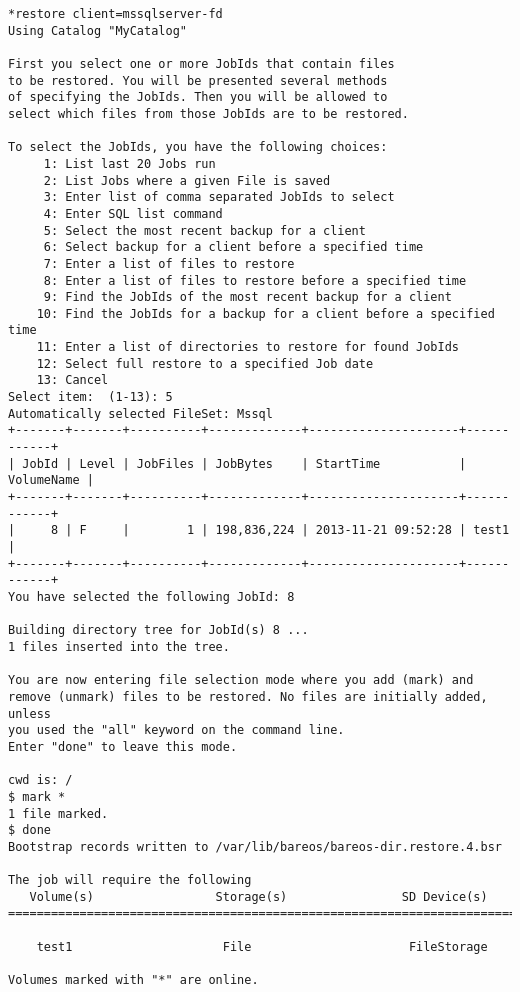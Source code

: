 \footnotesize
\begin{verbatim}
*restore client=mssqlserver-fd
Using Catalog "MyCatalog"

First you select one or more JobIds that contain files
to be restored. You will be presented several methods
of specifying the JobIds. Then you will be allowed to
select which files from those JobIds are to be restored.

To select the JobIds, you have the following choices:
     1: List last 20 Jobs run
     2: List Jobs where a given File is saved
     3: Enter list of comma separated JobIds to select
     4: Enter SQL list command
     5: Select the most recent backup for a client
     6: Select backup for a client before a specified time
     7: Enter a list of files to restore
     8: Enter a list of files to restore before a specified time
     9: Find the JobIds of the most recent backup for a client
    10: Find the JobIds for a backup for a client before a specified time
    11: Enter a list of directories to restore for found JobIds
    12: Select full restore to a specified Job date
    13: Cancel
Select item:  (1-13): 5
Automatically selected FileSet: Mssql
+-------+-------+----------+-------------+---------------------+------------+
| JobId | Level | JobFiles | JobBytes    | StartTime           | VolumeName |
+-------+-------+----------+-------------+---------------------+------------+
|     8 | F     |        1 | 198,836,224 | 2013-11-21 09:52:28 | test1      |
+-------+-------+----------+-------------+---------------------+------------+
You have selected the following JobId: 8

Building directory tree for JobId(s) 8 ...
1 files inserted into the tree.

You are now entering file selection mode where you add (mark) and
remove (unmark) files to be restored. No files are initially added, unless
you used the "all" keyword on the command line.
Enter "done" to leave this mode.

cwd is: /
$ mark *
1 file marked.
$ done
Bootstrap records written to /var/lib/bareos/bareos-dir.restore.4.bsr

The job will require the following
   Volume(s)                 Storage(s)                SD Device(s)
===========================================================================

    test1                     File                      FileStorage

Volumes marked with "*" are online.



\end{verbatim}

